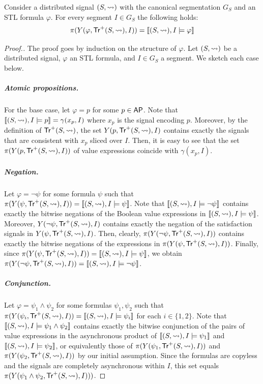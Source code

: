 \begin{lemma} \label{cl:eq}
	Consider a distributed signal $(S,{\rightsquigarrow})$ with the canonical segmentation $G_S$ and an STL formula $\varphi$.
	For every segment $I \in G_S$ the following holds:
	\[ \pi(Y(\varphi, \mathsf{Tr}^+(S,{\rightsquigarrow}), I)) = \llbracket (S,{\rightsquigarrow}), I \models \varphi \rrbracket \]
\end{lemma}
\begin{proof}[\normalsize Proof.]
	\normalsize
	The proof goes by induction on the structure of $\varphi$.
	Let $(S,{\rightsquigarrow})$ be a distributed signal, $\varphi$ an STL formula, and $I \in G_S$ a segment.
	We sketch each case below.
	
	\subparagraph*{Atomic propositions.}
	For the base case, let $\varphi = p$ for some $p \in \mathsf{AP}$.
	Note that $\llbracket (S, {\rightsquigarrow}), I \models p \rrbracket = \gamma(x_p, I)$ where $x_p$ is the signal encoding $p$.
	Moreover, by the definition of $\mathsf{Tr}^+(S,{\rightsquigarrow})$, the set $Y(p, \mathsf{Tr}^+(S,{\rightsquigarrow}), I)$ contains exactly the signals that are consistent with $x_p$ sliced over $I$.
	Then, it is easy to see that the set $\pi(Y(p, \mathsf{Tr}^+(S,{\rightsquigarrow}), I))$ of value expressions coincide with $\gamma(x_p, I)$.
	
	\subparagraph*{Negation.}
	Let $\varphi = \lnot \psi$ for some formula $\psi$ such that $\pi(Y(\psi, \mathsf{Tr}^+(S,{\rightsquigarrow}), I)) = \llbracket (S,{\rightsquigarrow}), I \models \psi \rrbracket$.
	Note that $\llbracket (S,{\rightsquigarrow}), I \models \lnot \psi \rrbracket$ contains exactly the bitwise negations of the Boolean value expressions in $\llbracket (S,{\rightsquigarrow}), I \models \psi \rrbracket$.
	Moreover, $Y(\lnot\psi, \mathsf{Tr}^+(S,{\rightsquigarrow}), I)$ contains exactly the negation of the satisfaction signals in $Y(\psi, \mathsf{Tr}^+(S,{\rightsquigarrow}), I)$.
	Then, clearly, $\pi(Y(\lnot\psi, \mathsf{Tr}^+(S,{\rightsquigarrow}), I))$ contains exactly the bitwise negations of the expressions in $\pi(Y(\psi, \mathsf{Tr}^+(S,{\rightsquigarrow}), I))$.
	Finally, since $\pi(Y(\psi, \mathsf{Tr}^+(S,{\rightsquigarrow}), I)) = \llbracket (S,{\rightsquigarrow}), I \models \psi \rrbracket$, we obtain $\pi(Y(\lnot\psi, \mathsf{Tr}^+(S,{\rightsquigarrow}), I)) = \llbracket (S,{\rightsquigarrow}), I \models \lnot\psi \rrbracket$.
	
	\subparagraph*{Conjunction.}
	Let $\varphi = \psi_1 \land \psi_2$ for some formulas $\psi_1, \psi_2$ such that $\pi(Y(\psi_i, \mathsf{Tr}^+(S,{\rightsquigarrow}), I)) = \llbracket (S,{\rightsquigarrow}), I \models \psi_i \rrbracket$ for each $i \in \{1,2\}$.
	Note that $\llbracket (S,{\rightsquigarrow}), I \models \psi_1 \land \psi_2 \rrbracket$ contains exactly the bitwise conjunction of the pairs of value expressions in the asynchronous product of $\llbracket (S,{\rightsquigarrow}), I \models \psi_1 \rrbracket$ and $\llbracket (S,{\rightsquigarrow}), I \models \psi_2 \rrbracket$, or equivalently those of $\pi(Y(\psi_1, \mathsf{Tr}^+(S,{\rightsquigarrow}), I))$ and $\pi(Y(\psi_2, \mathsf{Tr}^+(S,{\rightsquigarrow}), I))$ by our initial assumption.
	Since the formulas are copyless and the signals are completely asynchronous within $I$, this set equals $\pi(Y(\psi_1 \land \psi_2, \mathsf{Tr}^+(S,{\rightsquigarrow}), I)))$.
	

\end{proof}
